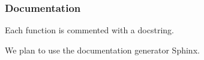 \documentclass{beamer}
\begin{document}



	\begin{frame}
		\frametitle{Documentation}
		Each function is commented with a docstring.
		
		We plan to use the documentation generator Sphinx.
	\end{frame}


\end{document}
